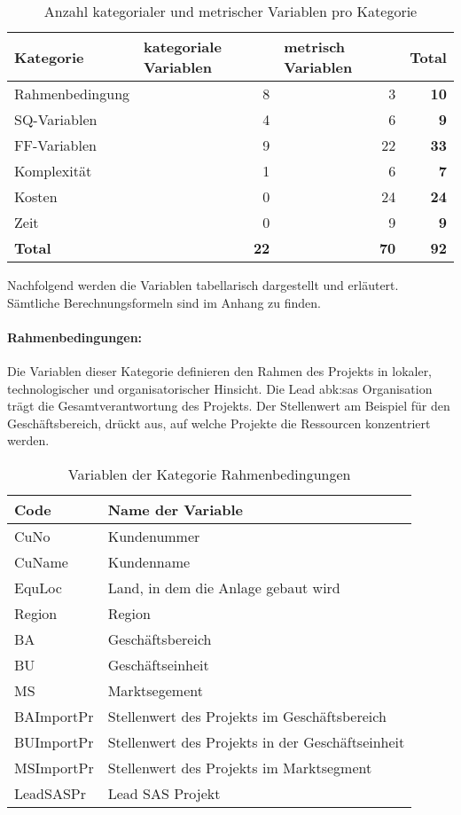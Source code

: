 \begin{table}[htbp]
	\centering
	\caption{Anzahl kategorialer und metrischer Variablen pro Kategorie}
	\begin{tabular}{lrr|r}
		\toprule
		Kategorie & \multicolumn{1}{l}{kategoriale Variablen} & \multicolumn{1}{l}{metrisch Variablen} & \multicolumn{1}{l}{\textbf{Total}} \\
		\midrule
		Rahmenbedingung & 8     & 3     & \textbf{10} \\
		SQ-Variablen & 4     & 6     & \textbf{9} \\
		FF-Variablen & 9    & 22    & \textbf{33} \\
		Komplexität & 1     & 6     & \textbf{7} \\
		Kosten  & 0     & 24    & \textbf{24} \\
		Zeit  & 0     & 9     & \textbf{9} \\
		\bottomrule
		\textbf{Total} & \textbf{22} & \textbf{70} & \textbf{92} \\
	\end{tabular}%
	\label{tab:katmet}%
\end{table}%
Nachfolgend werden die Variablen tabellarisch dargestellt und erläutert. Sämtliche Berechnungsformeln sind im Anhang zu finden. 
\paragraph{Rahmenbedingungen:} Die Variablen dieser Kategorie definieren den Rahmen des Projekts in lokaler, technologischer und organisatorischer Hinsicht. Die Lead \gls{abk:sas} Organisation trägt die Gesamtverantwortung des Projekts. Der Stellenwert am Beispiel für den Geschäftsbereich, drückt aus, auf welche Projekte die Ressourcen konzentriert werden.
\begin{table}[htbp]
	\centering
	\caption{Variablen der Kategorie Rahmenbedingungen}
	\begin{tabular}{ll}
		\toprule
		\textbf{Code} & \textbf{Name der Variable} \\
		\midrule
		CuNo  & Kundenummer \\
		CuName & Kundenname \\
		EquLoc & Land, in dem die Anlage gebaut wird \\
		Region & Region \\
		BA    & Geschäftsbereich \\
		BU    & Geschäftseinheit \\
		MS    & Marktsegement \\
		BAImportPr & Stellenwert des Projekts im Geschäftsbereich \\
		BUImportPr & Stellenwert des Projekts in der Geschäftseinheit \\
		MSImportPr & Stellenwert des Projekts im Marktsegment \\
		LeadSASPr & Lead SAS Projekt\\
		\bottomrule
	\end{tabular}%
	\label{tab:rahm}%
\end{table}%

